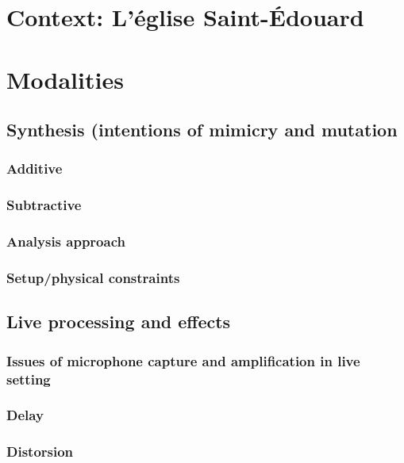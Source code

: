 \documentclass[12pt,twoside,maitrise]{dms}
\theoremstyle{definition}
\begin{document}
\section{Context: L'église Saint-Édouard}

\section{Modalities}

\subsection{Synthesis (intentions of mimicry and mutation}

\subsubsection{Additive}

\subsubsection{Subtractive}

\subsubsection{Analysis approach}

\subsubsection{Setup/physical constraints}

\subsection{Live processing and effects}

\subsubsection{Issues of microphone capture and amplification in live setting}

\subsubsection{Delay}

\subsubsection{Distorsion}
\end{document}
